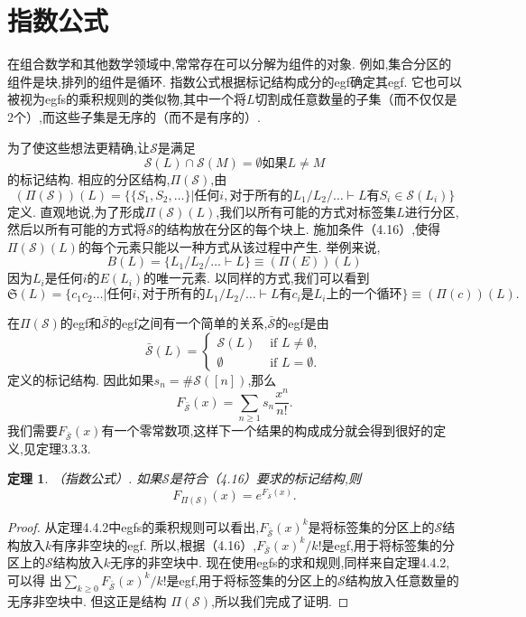 \documentclass[a4paper,12pt]{ctexbook}
\newtheorem{theorem}[lemma]{\hspace{2em}定理}%
\begin{document}
\section{指数公式}
在组合数学和其他数学领域中,常常存在可以分解为组件的对象.  例如,集合分区的组件是块,排列的组件是循环.  指数公式根据标记结构成分的egf确定其egf.  它也可以被视为egfs的乘积规则的类似物,其中一个将$L$切割成任意数量的子集（而不仅仅是2个）,而这些子集是无序的（而不是有序的）.  

为了使这些想法更精确,让$\mathcal{S}$是满足
\begin{equation}
\mathcal{S}(L)\cap \mathcal{S}(M)=\emptyset\text{如果}L\ne M
\end{equation}
的标记结构. 相应的{\kaishu 分区结构},$\varPi(\mathcal{S})$,由
$$(\varPi(\mathcal{S}))(L)=\{
\{S_1,S_2,\dots\}|\text{任何}i,\text{对于所有的}L_1/L_2/\dots\vdash L\text{有}S_i\in \mathcal{S}(L_i)
\}$$
定义. 
直观地说,为了形成$\varPi(\mathcal{S})(L)$,我们以所有可能的方式对标签集$L$进行分区,然后以所有可能的方式将$\mathcal{S}$的结构放在分区的每个块上.  施加条件（4.16）,使得$\varPi(\mathcal{S})(L)$的每个元素只能以一种方式从该过程中产生.  举例来说,
\begin{equation}
B(L)=\{L_1/L_2/\dots\vdash L
\}\equiv(\varPi(E))(L)
\end{equation}
因为$L_i$是任何$i$的$E(L_i)$的唯一元素.  以同样的方式,我们可以看到
\begin{equation}
   \mathfrak{S}(L)
   =\{c_1c_2\dots |\text{任何}i,\text{对于所有的}L_1/L_2/\dots\vdash L\text{有}c_i\text{是} L_i\text{上的一个循环}\}
   \equiv(\varPi(c))(L). 
\end{equation}

在$\varPi(\mathcal{S})$的egf和$\bar{\mathcal{S}}$的egf之间有一个简单的关系,$\bar{\mathcal{S}}$的egf是由
$$
\bar{\mathcal{S}}(L)=\begin{cases}
\mathcal{S}(L) & \text { if } L \neq \emptyset, \\
\emptyset & \text { if } L=\emptyset . 
\end{cases} 
$$
定义的标记结构. 
因此如果$s_n=\#\mathcal{S}([n])$,那么
$$F_{\bar{\mathcal{S}}}(x)=\sum_{n\geq1}s_n\frac{x^n}{n!}. $$
我们需要$F_{\bar{\mathcal{S}}}(x)$有一个零常数项,这样下一个结果的构成成分就会得到很好的定义,见定理3.3.3.  
\begin{theorem}
	（指数公式）.  如果$\mathcal{S}$是符合（4.16）要求的标记结构,则
	$$F_{\varPi(\mathcal{S})}(x)=e^{F_{\bar{\mathcal{S}}}(x)}. $$
\end{theorem}
\begin{proof}
	从定理4.4.2中egfs的乘积规则可以看出,$F_{\bar{\mathcal{S}}}(x)^k$是将标签集的分区上的$\mathcal{S}$结构放入$k$有序非空块的egf.  
	所以,根据（4.16）,$F_{\bar{\mathcal{S}}}(x)^k/k!$是egf,用于将标签集的分区上的$\mathcal{S}$结构放入$k$无序的非空块中.  现在使用egfs的求和规则,同样来自定理4.4.2,可以得
	出$\sum_{k\ge 0}F_{\bar{\mathcal{S}}}(x)^k/k!$是egf,用于将标签集的分区上的$\mathcal{S}$结构放入任意数量的无序非空块中.  但这正是结构
	$\varPi(\mathcal{S})$,所以我们完成了证明.  
\end{proof}
\end{document}
